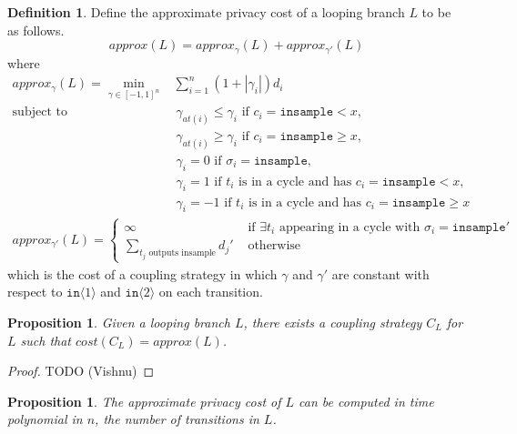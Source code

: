 \documentclass[12pt]{article}
\newcommand{\gguard}[1][x]{\texttt{insample}\geq #1}
\newcommand{\lguard}[1][x]{\texttt{insample} < #1}
\newcommand{\brangle}[1]{\langle #1 \rangle}
\newtheorem{prop}[thm]{Proposition}
\theoremstyle{definition}
\newtheorem{defn}[thm]{Definition}
\begin{document}
\begin{defn}
    Define the approximate privacy cost of a looping branch $L$ to be as follows.  
    \[approx(L) = approx_\gamma(L) + approx_{\gamma'}(L)\]
    where
    \begin{align*} 
        approx_\gamma(L) = \min_{\gamma \in [-1, 1]^n} &\sum_{i = 1}^n \left(1 + |\gamma_i| \right) d_i \\ 
            \text{subject to } 
            &\ \gamma_{at(i)} \leq \gamma_i \text{ if } c_i = \lguard, \\
            &\ \gamma_{at(i)} \geq \gamma_i \text{ if } c_i = \gguard, \\
            &\ \gamma_i = 0 \text{ if } \sigma_i = \texttt{insample}, \\
            &\ \gamma_i = 1 \text{ if } t_i \text{ is in a cycle and has } c_i = \lguard,\\ 
            &\ \gamma_i = -1 \text{ if } t_i \text{ is in a cycle and has } c_i = \gguard
    \end{align*}
    \begin{align*} 
        approx_{\gamma'}(L) = \begin{cases}
            \infty &\text{ if } \exists t_i \text{ appearing in a cycle with } \sigma_i = \texttt{insample}'\\
            \sum_{t_j \text{ outputs insample}} d_j' &\text{ otherwise} 
        \end{cases}
    \end{align*}
    which is the cost of a coupling strategy in which $\gamma$ and $\gamma'$ are constant with respect to $\texttt{in}\brangle{1}$ and $\texttt{in}\brangle{2}$ on each transition. 
\end{defn}

\begin{prop}
    Given a looping branch $L$, there exists a coupling strategy $C_L$ for $L$ such that $cost(C_L) = approx(L)$.
\end{prop}

\begin{proof}
    TODO (Vishnu)
\end{proof}

\begin{prop}
    The approximate privacy cost of $L$ can be computed in time  polynomial  in $n$, the number of transitions in $L$.
\end{prop}
\end{document}
